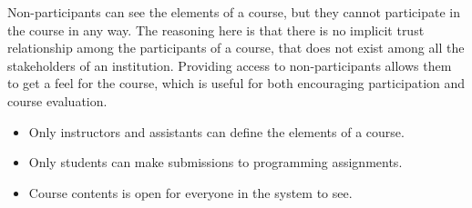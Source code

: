 Non-participants can see the elements of a course, but they cannot participate
in the course in any way. The reasoning here is that there is no implicit trust
relationship among the participants of a course, that does not exist among all
the stakeholders of an institution. Providing access to non-participants allows
them to get a feel for the course, which is useful for both encouraging
participation and course evaluation.

\begin{itemize}

\item Only instructors and assistants can define the elements of a course.

\item Only students can make submissions to programming assignments.

\item Course contents is open for everyone in the system to see.

\end{itemize}




